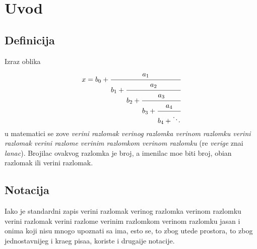 \documentclass[12pt, twoside, a4paper]{article}
\def\vr#1{\ifcase#1\relax\or
  ve\-ri{\zv}\-ni raz\-lo\-mak\or
  ve\-ri{\zv}\-nog raz\-lom\-ka\or
  ve\-ri{\zv}\-nom raz\-lom\-ku\or
  ve\-ri{\zv}\-ni raz\-lo\-mak\or
  ve\-ri{\zv}\-ni raz\-lom\-{\cv}e\or
  ve\-ri{\zv}\-nim raz\-lom\-kom\or
  ve\-ri{\zv}\-nom raz\-lom\-ku\fi}
\def\navod#1{\relax,\kern-0.06667em,\relax#1\relax``\relax}
\begin{document}

\let\ds=\displaystyle


\tableofcontents

\section{Uvod}

\subsection{Definicija}

Izraz oblika
$$
x=b_0+\cfrac{a_1}{b_1+\cfrac{a_2}{b_2+\cfrac{a_3}{b_3+\cfrac{a_4}{b_4+\ddots}}}}
$$
u matematici se zove {\sl\vr1\/} (re{\cv} {\it verige\/} zna{\cv}i {\it lanac\/}).
Brojilac ovakvog raz\-lom\-ka je broj, a imenilac mo{\zv}e biti broj, obi{\cv}an razlomak ili
veri{\zv}ni razlomak.

\subsection{Notacija}

Iako je standardni zapis \vr2 jasan i onima koji nisu mnogo upoznati sa {\nj}ima,
{\cv}esto se, {\sv}to zbog u{\sv}tede prostora, {\sv}to zbog jednostavnijeg i kra{\cc}eg pisa{\nj}a,
koriste i druga{\cv}ije notacije.
\end{document}
